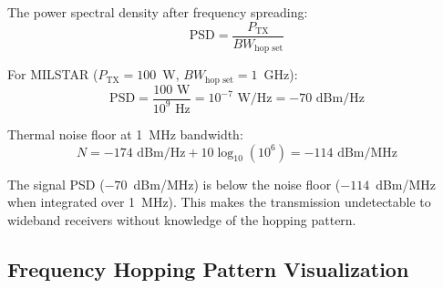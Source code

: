 The power spectral density after frequency spreading:
\begin{equation}
\text{PSD} = \frac{P_{\text{TX}}}{BW_{\text{hop set}}}
\end{equation}

For MILSTAR ($P_{\text{TX}} = 100$~W, $BW_{\text{hop set}} = 1$~GHz):
\begin{equation}
\text{PSD} = \frac{100 \text{ W}}{10^9 \text{ Hz}} = 10^{-7} \text{ W/Hz} = -70 \text{ dBm/Hz}
\end{equation}

Thermal noise floor at 1~MHz bandwidth:
\begin{equation}
N = -174 \text{ dBm/Hz} + 10 \log_{10}(10^6) = -114 \text{ dBm/MHz}
\end{equation}

\begin{keyconcept}
The signal PSD ($-70$~dBm/MHz) is below the noise floor ($-114$~dBm/MHz when integrated over 1~MHz). This makes the transmission undetectable to wideband receivers without knowledge of the hopping pattern.
\end{keyconcept}

\subsection{Frequency Hopping Pattern Visualization}

